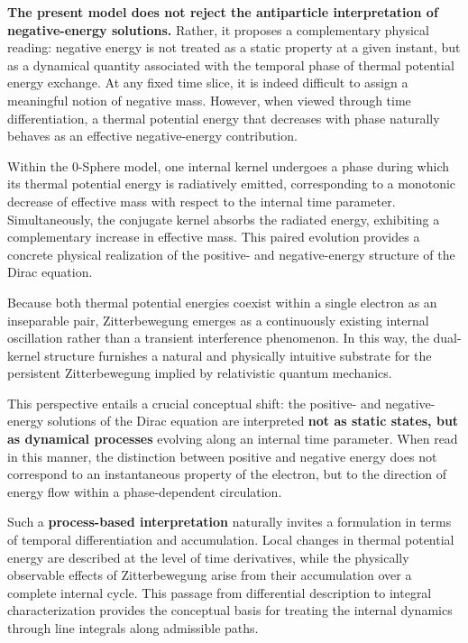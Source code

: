 \documentclass[%
 reprint,
 amsmath,amssymb,
 aps,
 prb,
]{revtex4-2}
\numberwithin{equation}{section}
\begin{document}
\textbf{The present model does not reject the antiparticle interpretation of negative-energy solutions.}
Rather, it proposes a complementary physical reading: negative energy is not treated as a static property at a given instant, but as a dynamical quantity associated with the temporal phase of thermal potential energy exchange.
At any fixed time slice, it is indeed difficult to assign a meaningful notion of negative mass.
However, when viewed through time differentiation, a thermal potential energy that decreases with phase naturally behaves as an effective negative-energy contribution.

Within the 0-Sphere model, one internal kernel undergoes a phase during which its thermal potential energy is radiatively emitted, corresponding to a monotonic decrease of effective mass with respect to the internal time parameter.
Simultaneously, the conjugate kernel absorbs the radiated energy, exhibiting a complementary increase in effective mass.
This paired evolution provides a concrete physical realization of the positive- and negative-energy structure of the Dirac equation.

Because both thermal potential energies coexist within a single electron as an inseparable pair, Zitterbewegung emerges as a continuously existing internal oscillation rather than a transient interference phenomenon.
In this way, the dual-kernel structure furnishes a natural and physically intuitive substrate for the persistent Zitterbewegung implied by relativistic quantum mechanics.

This perspective entails a crucial conceptual shift: the positive- and negative-energy solutions of the Dirac equation are interpreted \textbf{not as static states, but as dynamical processes} evolving along an internal time parameter.
When read in this manner, the distinction between positive and negative energy does not correspond to an instantaneous property of the electron, but to the direction of energy flow within a phase-dependent circulation.

Such a \textbf{process-based interpretation} naturally invites a formulation in terms of temporal differentiation and accumulation.
Local changes in thermal potential energy are described at the level of time derivatives, while the physically observable effects of Zitterbewegung arise from their accumulation over a complete internal cycle.
This passage from differential description to integral characterization provides the conceptual basis for treating the internal dynamics through line integrals along admissible paths.
\end{document}
